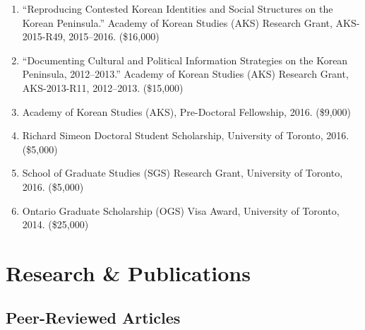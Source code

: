 \documentclass[11pt, a4paper]{article}
\begin{document}
\begin{enumerate}[itemsep=0.15em]
  \item ``Reproducing Contested Korean Identities and Social Structures on the Korean Peninsula.'' Academy of Korean Studies (AKS) Research Grant, AKS-2015-R49, 2015--2016. (\$16,000)\dag

  \item ``Documenting Cultural and Political Information Strategies on the Korean Peninsula, 2012--2013.'' Academy of Korean Studies (AKS) Research Grant, AKS-2013-R11, 2012--2013. (\$15,000)\dag

  \item Academy of Korean Studies (AKS), Pre-Doctoral Fellowship, 2016. (\$9,000)

  \item Richard Simeon Doctoral Student Scholarship, University of Toronto, 2016. (\$5,000)

  \item School of Graduate Studies (SGS) Research Grant, University of Toronto, 2016. (\$5,000)

  \item Ontario Graduate Scholarship (OGS) Visa Award, University of Toronto, 2014. (\$25,000)
\end{enumerate}

\section{Research \& Publications}

\subsection{Peer-Reviewed Articles}
\end{document}
